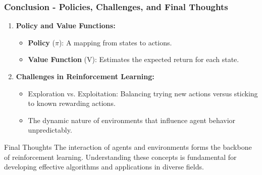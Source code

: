 \documentclass[aspectratio=169]{beamer}
\begin{document}
\begin{frame}[fragile]
  \frametitle{Conclusion - Policies, Challenges, and Final Thoughts}
  \begin{enumerate}[resume]
    \item \textbf{Policy and Value Functions:}
    \begin{itemize}
      \item \textbf{Policy} (\(\pi\)): A mapping from states to actions.
      \item \textbf{Value Function} (V): Estimates the expected return for each state.
    \end{itemize}

    \item \textbf{Challenges in Reinforcement Learning:}
    \begin{itemize}
      \item Exploration vs. Exploitation: Balancing trying new actions versus sticking to known rewarding actions.
      \item The dynamic nature of environments that influence agent behavior unpredictably.
    \end{itemize}
  \end{enumerate}

  \begin{block}{Final Thoughts}
    The interaction of agents and environments forms the backbone of reinforcement learning. Understanding these concepts is fundamental for developing effective algorithms and applications in diverse fields.
  \end{block}
\end{frame}
\end{document}
